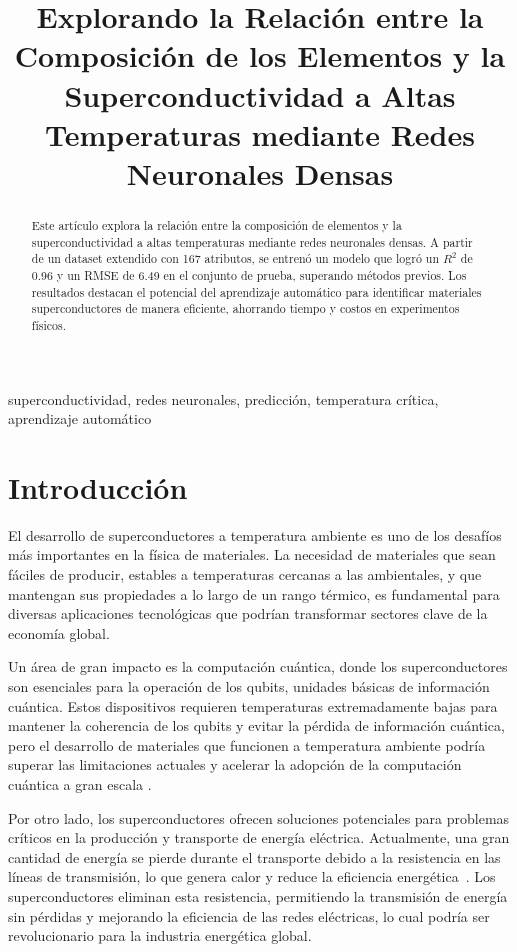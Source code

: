 \documentclass[conference]{IEEEtran} %
\title{Explorando la Relación entre la Composición de los Elementos y la Superconductividad a Altas Temperaturas mediante Redes Neuronales Densas}
\author{\IEEEauthorblockN{Eber David Gayt\'an Medina}
\IEEEauthorblockA{\textit{Centro de Investigación Científica y de Educación Superior de Ensenada - Introducci\'on a la Ciencia de Datos} \\
eber@cicese.edu.mx}

}
\begin{document}
\maketitle

\begin{abstract}
    Este artículo explora la relación entre la composición de elementos y 
    la superconductividad a altas temperaturas mediante redes neuronales 
    densas. A partir de un dataset extendido con 167 atributos, se entrenó
    un modelo que logró un $R^2$ de 0.96 y un RMSE de 6.49 en el conjunto 
    de prueba, superando métodos previos. Los resultados destacan el 
    potencial del aprendizaje automático para identificar materiales 
    superconductores de manera eficiente, ahorrando tiempo y costos en 
    experimentos físicos.
\end{abstract}

\begin{IEEEkeywords}
    superconductividad, redes neuronales, predicción, 
    temperatura crítica, aprendizaje automático
\end{IEEEkeywords}
    
    

\section{Introducción}

El desarrollo de superconductores a temperatura ambiente es uno de los desafíos más 
importantes en la física de materiales. La necesidad de materiales que sean fáciles 
de producir, estables a temperaturas cercanas a las ambientales, y que mantengan sus 
propiedades a lo largo de un rango térmico, es fundamental para diversas aplicaciones 
tecnológicas que podrían transformar sectores clave de la economía global.

Un área de gran impacto es la computación cuántica, donde los superconductores son 
esenciales para la operación de los qubits, unidades básicas de información cuántica. 
Estos dispositivos requieren temperaturas extremadamente bajas para mantener la 
coherencia de los qubits y evitar la pérdida de información cuántica, pero el 
desarrollo de materiales que funcionen a temperatura ambiente podría superar las 
limitaciones actuales y acelerar la adopción de la computación cuántica a gran 
escala \cite{Bassman_Oftelie_2024}.

Por otro lado, los superconductores ofrecen soluciones potenciales para problemas 
críticos en la producción y transporte de energía eléctrica. Actualmente, una 
gran cantidad de energía se pierde durante el transporte debido a la resistencia 
en las líneas de transmisión, lo que genera calor y reduce la eficiencia energética~\cite{sarajcev2000calculation}. 
Los superconductores eliminan esta resistencia, permitiendo la transmisión de energía 
sin pérdidas y mejorando la eficiencia de las redes eléctricas, lo cual podría ser
revolucionario para la industria energética global.
\end{document}
